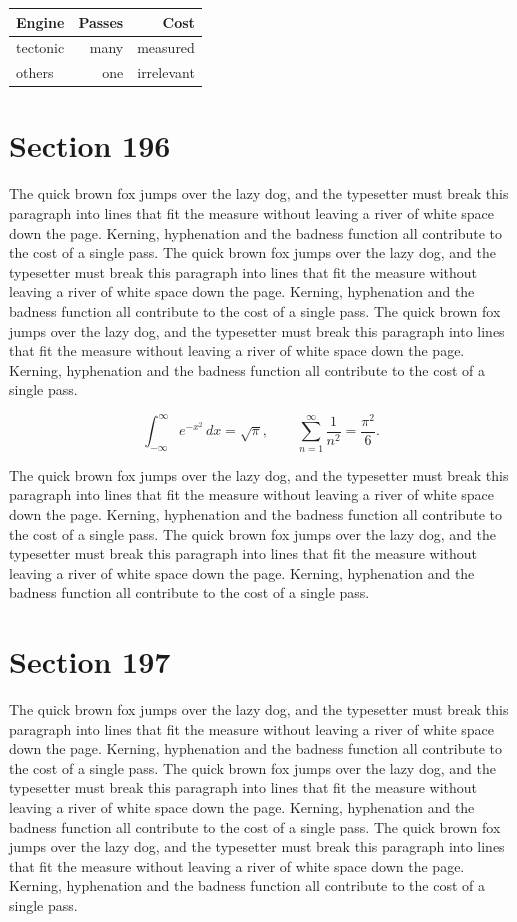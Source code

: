 \documentclass{article}
\begin{document}
\begin{center}
\begin{tabular}{lrr}
\toprule
Engine & Passes & Cost \\
\midrule
tectonic & many & measured \\
others & one & irrelevant \\
\bottomrule
\end{tabular}
\end{center}

\section{Section 196}
The quick brown fox jumps over the lazy dog, and the typesetter must break this paragraph into lines that fit the measure without leaving a river of white space down the page. Kerning, hyphenation and the badness function all contribute to the cost of a single pass. The quick brown fox jumps over the lazy dog, and the typesetter must break this paragraph into lines that fit the measure without leaving a river of white space down the page. Kerning, hyphenation and the badness function all contribute to the cost of a single pass. The quick brown fox jumps over the lazy dog, and the typesetter must break this paragraph into lines that fit the measure without leaving a river of white space down the page. Kerning, hyphenation and the badness function all contribute to the cost of a single pass. 

\begin{equation}
\int_{-\infty}^{\infty} e^{-x^{2}}\,dx = \sqrt{\pi}, \qquad
\sum_{n=1}^{\infty} \frac{1}{n^{2}} = \frac{\pi^{2}}{6}.
\end{equation}

The quick brown fox jumps over the lazy dog, and the typesetter must break this paragraph into lines that fit the measure without leaving a river of white space down the page. Kerning, hyphenation and the badness function all contribute to the cost of a single pass. The quick brown fox jumps over the lazy dog, and the typesetter must break this paragraph into lines that fit the measure without leaving a river of white space down the page. Kerning, hyphenation and the badness function all contribute to the cost of a single pass. 
\section{Section 197}
The quick brown fox jumps over the lazy dog, and the typesetter must break this paragraph into lines that fit the measure without leaving a river of white space down the page. Kerning, hyphenation and the badness function all contribute to the cost of a single pass. The quick brown fox jumps over the lazy dog, and the typesetter must break this paragraph into lines that fit the measure without leaving a river of white space down the page. Kerning, hyphenation and the badness function all contribute to the cost of a single pass. The quick brown fox jumps over the lazy dog, and the typesetter must break this paragraph into lines that fit the measure without leaving a river of white space down the page. Kerning, hyphenation and the badness function all contribute to the cost of a single pass. 
\end{document}
